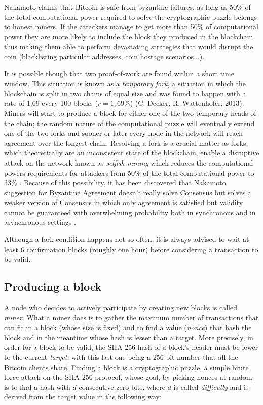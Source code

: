 		Nakamoto claims that Bitcoin is safe from byzantine failures, as long as 50\% of the total computational power required to solve the cryptographic puzzle belongs to honest miners. If the attackers manage to get more than 50\% of computational power they are more likely to include the block they produced in the blockchain thus making them able to perform devastating strategies that would disrupt the coin (blacklisting particular addresses, coin hostage scenarios...).
		
		It is possible though that two proof-of-work are found within a short time window. This situation is known as a \textit{temporary fork}, a situation in which the blockchain is split in two chains of equal size and was found to happen with a rate of 1,69 every 100 blocks (\(r = 1,69\%\)) (C. Decker, R. Wattenhofer, 2013). Miners will start to produce a block for either one of the two temporary heads of the chain; the random nature of the computational puzzle will eventually extend one of the two forks and sooner or later every node in the network will reach agreement over the longest chain. Resolving a fork is a crucial matter as forks, which theoretically are an inconsistent state of the blockchain, enable a disruptive attack on the network known as \textit{selfish mining} which reduces the computational powers requirements for attackers from 50\% of the total computational power to 33\% \cite{Eyal2013}. Because of this possibility, it has been discovered that Nakamoto suggestion for Byzantine Agreement doesn’t really solve Consensus but solves a weaker version of Consensus in which only agreement is satisfied but validity cannot be guaranteed with overwhelming probability both in synchronous \cite{Garay2015} and in asynchronous settings \cite{Pass2016}.
		
		Although a fork condition happens not so often, it is always advised to wait at least 6 confirmation blocks (roughly one hour) before considering a transaction to be valid.
		
		\subsection{Producing a block}
		
		A node who decides to actively participate by creating new blocks is called \textit{miner}. What a miner does is to gather the maximum number of transactions that can fit in a block (whose size is fixed) and to find a value (\textit{nonce}) that hash the block and in the meantime whose hash is lesser than a target. More precisely, in order for a block to be valid, the SHA-256 hash of a block's header must be lower to the current \textit{target}, with this last one being a 256-bit number that all the Bitcoin clients share. Finding a block is a cryptographic puzzle, a simple brute force attack on the SHA-256 protocol, whose goal, by picking nonces at random, is to find a hash with \(d\) consecutive zero bits, where \(d\) is called \textit{difficulty} and is derived from the target value in the following way:
		
